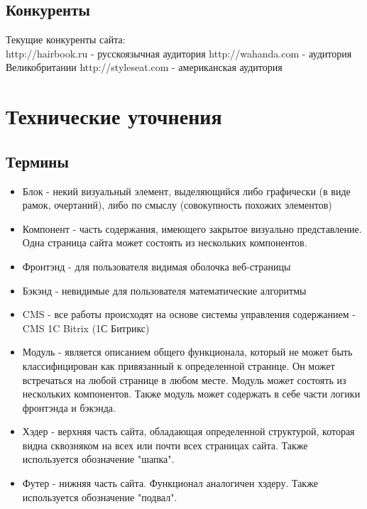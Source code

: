 \documentclass[DIV=calc, paper=a4, fontsize=11pt]{scrartcl} %
\begin{document}
\subsection{Конкуренты}
Текущие конкуренты сайта:
\\[0.5cm]
http://hairbook.ru - русскоязычная аудитория
\newline http://wahanda.com - аудитория Великобритании
\newline http://styleseat.com - американская аудитория

\section{Технические уточнения}

\subsection{Термины}

        \begin{itemize}
        \item Блок - некий визуальный элемент, выделяющийся либо графически (в виде рамок, очертаний), либо по смыслу (совокупность похожих элементов)
        \item Компонент - часть содержания, имеющего закрытое визуально представление. Одна страница сайта может состоять из нескольких компонентов.
        \item Фронтэнд - для пользователя видимая оболочка веб-страницы
        \item Бэкэнд - невидимые для пользователя математические алгоритмы
        \item CMS - все работы происходят на основе системы управления содержанием - CMS 1C Bitrix (1С Битрикс)
        \item Модуль - является описанием общего функционала, который не может быть классифицирован как привязанный к определенной странице. Он может встречаться на любой странице в любом месте. Модуль может состоять из нескольких компонентов. Также модуль может содержать в себе части логики фронтэнда и бэкэнда.
        \item Хэдер - верхняя часть сайта, обладающая определенной структурой, которая видна сквозняком на всех или почти всех страницах сайта. Также используется обозначение "шапка".
        \item Футер - нижняя часть сайта. Функционал аналогичен хэдеру. Также используется обозначение "подвал".
    \end{itemize}
\end{document}
